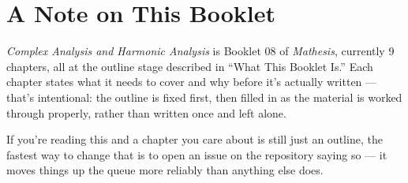 \chapter*{A Note on This Booklet}

\textit{Complex Analysis and Harmonic Analysis} is Booklet 08 of \textit{Mathesis}, currently 9 chapters, all at the outline stage described in ``What This Booklet Is.'' Each chapter states what it needs to cover and why before it's actually written --- that's intentional: the outline is fixed first, then filled in as the material is worked through properly, rather than written once and left alone.

If you're reading this and a chapter you care about is still just an outline, the fastest way to change that is to open an issue on the repository saying so --- it moves things up the queue more reliably than anything else does.
